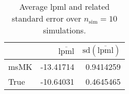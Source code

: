 \begin{table}[H]

\caption{Average lpml and related standard error over $n_{\text{sim}} = 10$ simulations.}
\centering
\begin{tabular}[t]{lrr}
\toprule
  & $\overbar{\text{lpml}}$ & $\text{sd}(\overbar{\text{lpml}})$\\
\midrule
msMK & -13.41714 & 0.9414259\\
True & -10.64031 & 0.4645465\\
\bottomrule
\end{tabular}
\end{table}